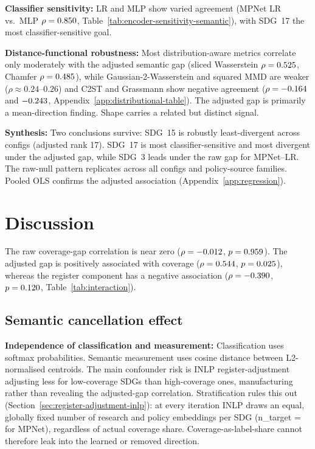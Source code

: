 \documentclass[12pt,a4paper]{article}
\let\OldSection\section
\renewcommand{\section}{\clearpage\FloatBarrier\OldSection}
\begin{document}
\textbf{Classifier sensitivity:} LR and MLP show varied agreement (MPNet LR vs.\ MLP $\rho = 0.850$, Table~\ref{tab:encoder-sensitivity-semantic}), with SDG~17 the most classifier-sensitive goal.

\textbf{Distance-functional robustness:} Most distribution-aware metrics correlate only moderately with the adjusted semantic gap (sliced Wasserstein $\rho=0.525$, Chamfer $\rho=0.485$), while Gaussian-2-Wasserstein and squared MMD are weaker ($\rho \approx 0.24$--$0.26$) and C2ST and Grassmann show negative agreement ($\rho = -0.164{}$ and $-0.243{}$, Appendix~\ref{app:distributional-table}). The adjusted gap is primarily a mean-direction finding. Shape carries a related but distinct signal.

\textbf{Synthesis:} Two conclusions survive: SDG~15 is robustly least-divergent across configs (adjusted rank 17). SDG~17 is most classifier-sensitive and most divergent under the adjusted gap, while SDG~3 leads under the raw gap for MPNet--LR. The raw-null pattern replicates across all configs and policy-source families. Pooled OLS confirms the adjusted association (Appendix~\ref{app:regression}).

\section{Discussion}
\label{sec:discussion}

The raw coverage-gap correlation is near zero ($\rho = -0.012$, $p = 0.959$). The adjusted gap is positively associated with coverage ($\rho = 0.544$, $p = 0.025$), whereas the register component has a negative association ($\rho = -0.390$, $p = 0.120$, Table~\ref{tab:interaction}).

\subsection{Semantic cancellation effect}
\label{sec:discussion-cancellation}

 \textbf{Independence of classification and measurement:} Classification uses softmax probabilities. Semantic measurement uses cosine distance between L2-normalised centroids. The main confounder risk is INLP register-adjustment adjusting less for low-coverage SDGs than high-coverage ones, manufacturing rather than revealing the adjusted-gap correlation. Stratification rules this out (Section~\ref{sec:register-adjustment-inlp}): at every iteration INLP draws an equal, globally fixed number of research and policy embeddings per SDG (n\_target = \RegisterIterNPerSdg{} for MPNet), regardless of actual coverage share. Coverage-as-label-share cannot therefore leak into the learned or removed direction.
\end{document}

